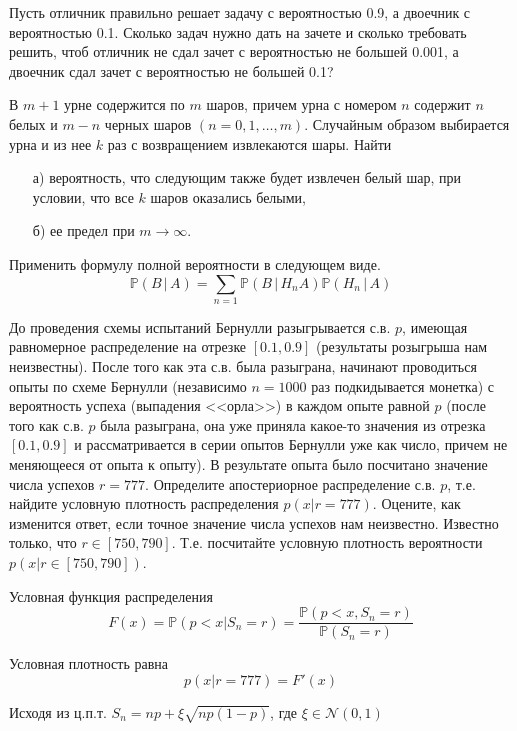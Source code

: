 \begin{problem}
Пусть отличник правильно решает задачу с вероятностью 0.9, а двоечник с вероятностью 0.1. Сколько задач нужно дать на зачете и сколько требовать решить, чтоб отличник не сдал зачет с вероятностью не большей 0.001, а двоечник сдал зачет с вероятностью не большей 0.1?
\end{problem}

\begin{problem}
В $m+1$ урне содержится по $m$ шаров, причем урна с номером $n$ содержит $n$ белых и $m-n$ черных шаров $(n = 0,1,\ldots,m)$. 
Случайным образом выбирается урна и из нее $k$ раз с возвращением извлекаются шары. Найти 
\begin{enumerate}
\item[а)] вероятность, что следующим также будет извлечен белый шар, при условии, что все $k$ шаров оказались белыми, 
\item[б)] ее предел при $m\to\infty$. 
\end{enumerate}
\end{problem}

\begin{ordre}
Применить формулу полной вероятности в следующем виде. 
$$
{\mathbb P}(B\, |\, A)=\sum\limits_{n=1} {\mathbb P}(B\, |\, H_n A){\mathbb P}(H_n\, |\, A)
$$
\end{ordre}


\begin{problem}
До проведения схемы испытаний Бернулли разыгрывается с.в. $p$, имеющая равномерное распределение на отрезке $[0.1, 0.9]$ 
(результаты розыгрыша нам неизвестны). После того как эта с.в. была разыграна, начинают проводиться опыты по схеме Бернулли 
(независимо $n=1000$ раз подкидывается монетка) с вероятность успеха (выпадения <<орла>>) в каждом опыте равной $p$ 
(после того как с.в. $p$ была разыграна, она уже приняла какое-то значения из отрезка $[0.1, 0.9]$ и рассматривается в серии опытов 
Бернулли уже как число, причем не меняющееся от опыта к опыту). В результате опыта было посчитано значение числа успехов $r=777$. 
Определите апостериорное распределение с.в. $p$, т.е. найдите условную плотность распределения $p(x|r=777)$. Оцените, как изменится 
ответ, если точное значение числа успехов нам неизвестно. Известно только, что $r\in[750, 790]$. Т.е. посчитайте условную 
плотность вероятности $p(x|r\in[750, 790])$. 
\end{problem}

\begin{ordre}

Условная функция распределения 
$$
F(x)={\mathbb P}(p<x|S_n=r)=\frac{{\mathbb P}(p<x, S_n=r)}{{\mathbb P}(S_n=r)}
$$

Условная плотность равна 
$$
p(x|r=777)=F'(x) 
$$

Исходя из ц.п.т.  $S_n=np+\xi\sqrt{np(1-p)}$, где $\xi\in {\mathcal N}(0,1)$

\end{ordre}

